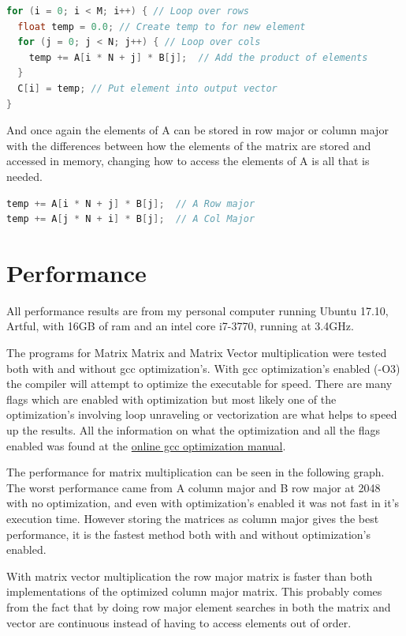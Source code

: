\documentclass[a4paper]{article}
\begin{document}
\begin{lstlisting}[language=C++]
for (i = 0; i < M; i++) { // Loop over rows
  float temp = 0.0; // Create temp to for new element
  for (j = 0; j < N; j++) { // Loop over cols
    temp += A[i * N + j] * B[j];  // Add the product of elements
  }
  C[i] = temp; // Put element into output vector
}
\end{lstlisting}

And once again the elements of A can be stored in row major or column major with the differences between how the elements of the matrix are stored and accessed in memory, changing how to access the elements of A is all that is needed.

\begin{lstlisting}[language=C++]
temp += A[i * N + j] * B[j];  // A Row major
temp += A[j * N + i] * B[j];  // A Col Major
\end{lstlisting}

\section*{Performance}
All performance results are from my personal computer running Ubuntu 17.10, Artful, with 16GB of ram and an intel core i7-3770, running at 3.4GHz.

The programs for Matrix Matrix and Matrix Vector multiplication were tested both with and without gcc optimization's. With gcc optimization's enabled (-O3) the compiler will attempt to optimize the executable for speed. There are many flags which are enabled with optimization but most likely one of the optimization's involving loop unraveling or vectorization are what helps to speed up the results. All the information on what the optimization and all the flags enabled was found at the \href{https://gcc.gnu.org/onlinedocs/gcc/Optimize-Options.html}{online gcc optimization manual}.

The performance for matrix multiplication can be seen in the following graph. The worst performance came from A column major and B row major at 2048 with no optimization, and even with optimization's enabled it was not fast in it's execution time. However storing the matrices as column major gives the best performance, it is the fastest method both with and without optimization's enabled.

With matrix vector multiplication the row major matrix is faster than both implementations of the optimized column major matrix. This probably comes from the fact that by doing row major element searches in both the matrix and vector are continuous instead of having to access elements out of order.
\end{document}
